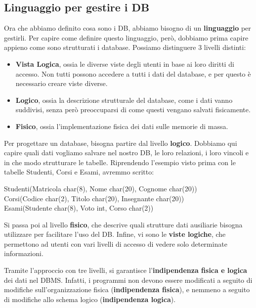 \documentclass[11pt, a4paper, titlepage, oneside]{scrbook}
\begin{document}
\subsection{Linguaggio per gestire i DB}

Ora che abbiamo definito cosa sono i DB, abbiamo bisogno di un \textbf{linguaggio} per gestirli. Per capire come definire questo linguaggio, però, dobbiamo prima capire appieno come sono strutturati i database. Possiamo distinguere 3 livelli distinti:
\begin{itemize}
    \item \textbf{Vista Logica}, ossia le diverse viste degli utenti in base ai loro diritti di accesso. Non tutti possono accedere a tutti i dati del database, e per questo è necessario creare viste diverse.
    \item \textbf{Logico}, ossia la descrizione strutturale del database, come i dati vanno suddivisi, senza però preoccuparsi di come questi vengano salvati fisicamente.
    \item \textbf{Fisico}, ossia l'implementazione fisica dei dati sulle memorie di massa. 
\end{itemize}

Per progettare un database, bisogna partire dal livello \textbf{logico}. Dobbiamo qui capire quali dati vogliamo salvare nel nostro DB, le loro relazioni, i loro vincoli e in che modo strutturare le tabelle. Riprendendo l'esempio visto prima con le tabelle Studenti, Corsi e Esami, avremmo scritto: 
\begin{center}
Studenti(Matricola char(8), Nome char(20), Cognome char(20)) \\
Corsi(Codice char(2), Titolo char(20), Insegnante char(20)) \\
Esami(Studente char(8), Voto int, Corso char(2))
\end{center}

Si passa poi al livello \textbf{fisico}, che descrive quali strutture dati ausiliarie bisogna utilizzare per facilitare l'uso del DB. Infine, vi sono le \textbf{viste logiche}, che permettono ad utenti con vari livelli di accesso di vedere solo determinate informazioni. 

\begin{Proposizione}
\label{propos-indipendenza-fisica-logica}
Tramite l'approccio con tre livelli, si garantisce l'\textbf{indipendenza fisica e logica} dei dati nel DBMS. Infatti, i programmi non devono essere modificati a seguito di modifiche sull'organizzazione fisica (\textbf{indipendenza fisica}), e nemmeno a seguito di modifiche allo schema logico (\textbf{indipendenza logica}).
\end{Proposizione}
\end{document}

